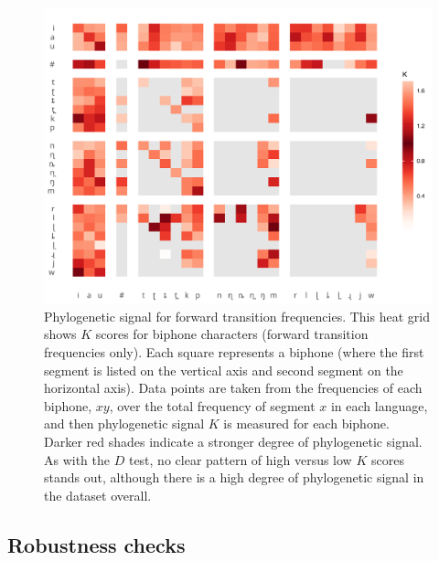 \begin{figure}[tbp]

{\centering \includegraphics[width=0.75\linewidth]{05-phylo-signal/fig/k-swatch} 

}

\caption[Phylogenetic signal for forward transition frequencies]{Phylogenetic signal for forward transition frequencies. This heat grid shows $K$ scores for biphone characters (forward transition frequencies only). Each square represents a biphone (where the first segment is listed on the vertical axis and second segment on the horizontal axis). Data points are taken from the frequencies of each biphone, $xy$, over the total frequency of segment $x$ in each language, and then phylogenetic signal $K$ is measured for each biphone. Darker red shades indicate a stronger degree of phylogenetic signal. As with the $D$ test, no clear pattern of high versus low $K$ scores stands out, although there is a high degree of phylogenetic signal in the dataset overall.}\label{fig:k-swatch}
\end{figure}

\hypertarget{phy-sig-cont-robustness}{%
\subsection{Robustness checks}\label{phy-sig-cont-robustness}}

